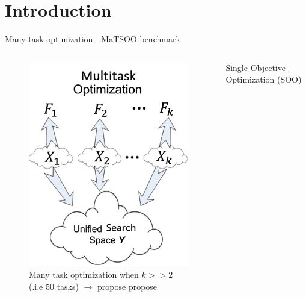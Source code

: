 \section{Introduction}

\begin{frame}{Many task optimization - MaTSOO benchmark}
    \begin{columns}
        \begin{column}{0.4\textwidth}
            \begin{figure}
                \includegraphics[width=\textwidth]{figure/intro/mto.png}
                \caption{Many task optimization when $k >> 2$ (.i.e $50$ tasks) $\rightarrow$ propose \gls{propose}}
            \end{figure}
        \end{column}
        \begin{column}{0.48\textwidth}
            \begin{block}{Single Objective Optimization (SOO)}
                \begin{figure}

\end{figure}
\end{block}
\end{column}
\end{columns}
\end{frame}
